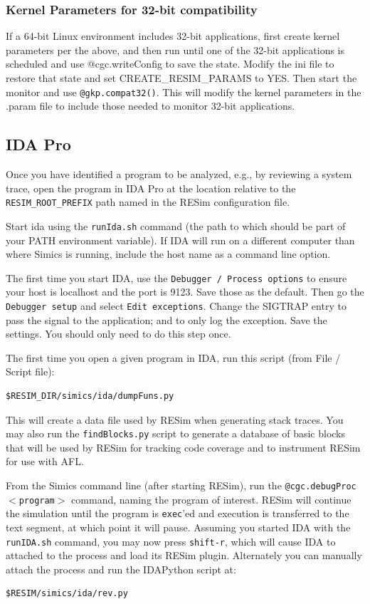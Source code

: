 \documentclass[titlepage]{article}
\begin{document}
\subsubsection{Kernel Parameters for 32-bit compatibility}
If a 64-bit Linux environment includes 32-bit applications, first create kernel parameters per the above, and then run until one of the 32-bit applications
is scheduled and use @cgc.writeConfig to save
the state.  Modify the ini file to restore that state and set CREATE\_RESIM\_PARAMS to YES.  Then start the monitor and use
{\tt @gkp.compat32()}.  This will modify the kernel parameters in the .param file to include those needed to monitor 32-bit applications.

\subsection{IDA Pro}
\label{ida}
Once you have identified a program to be analyzed, e.g., by reviewing a system trace, open the program in IDA Pro at the location relative to the 
{\tt RESIM\_ROOT\_PREFIX} path named in the RESim configuration file.  

Start ida using the {\tt runIda.sh} command (the path to which should be part of your PATH environment variable).
If IDA will run on a different computer than where Simics is running, include the host name as a command line option.

The first time you start IDA, use the {\tt Debugger / Process options} to ensure your host is localhost and the port is 9123.  Save those as 
the default.  Then go the {\tt Debugger setup} and select {\tt Edit exceptions}.  Change the SIGTRAP entry to pass the signal to the application;
and to only log the exception.  Save the settings.  You should only need to do this step once.

The first time you open a given program in IDA, run this script (from File / Script file):
\begin{verbatim}
$RESIM_DIR/simics/ida/dumpFuns.py 
\end{verbatim}
\noindent This will create a data file used by RESim when generating stack traces.
You may also run the {\tt findBlocks.py} script to generate a database of basic blocks that will be used by RESim for tracking code
coverage and to instrument RESim for use with AFL.

From the Simics command line (after starting RESim), run the {\tt @cgc.debugProc$<$program$>$} command, naming the program of interest.
RESim will continue the simulation until the program is {\tt exec}'ed and execution is transferred to the text segment, at which point it will pause.
Assuming you started IDA with the {\tt runIDA.sh} command, you may now press {\tt shift-r}, which will cause IDA to attached to the
process and load its RESim plugin.  Alternately you can manually attach the process and run the IDAPython script at:
\begin{verbatim}
$RESIM/simics/ida/rev.py
\end{verbatim}
\end{document}
